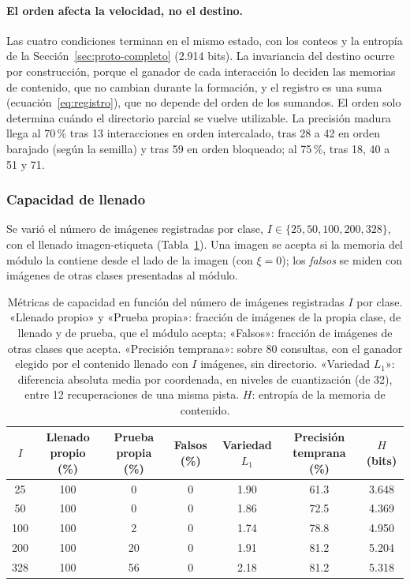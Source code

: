 \paragraph{El orden afecta la velocidad, no el destino.}
Las cuatro condiciones terminan en el mismo estado, con los conteos y la entropía de la
Sección~\ref{sec:proto-completo} (2.914 bits).
La invariancia del destino ocurre por construcción, porque el ganador de cada
interacción lo deciden las memorias de contenido, que no cambian durante la formación, y
el registro es una suma (ecuación~\eqref{eq:registro}), que no depende del orden de los
sumandos.
El orden solo determina cuándo el directorio parcial se vuelve utilizable.
La precisión madura llega al 70\,\% tras 13 interacciones en orden intercalado, tras 28 a
42 en orden barajado (según la semilla) y tras 59 en orden bloqueado; al 75\,\%, tras 18,
40 a 51 y 71.

\subsubsection{Capacidad de llenado}
\label{sec:capacidad}

Se varió el número de imágenes registradas por clase,
$I \in \{25, 50, 100, 200, 328\}$, con el llenado imagen-etiqueta
(Tabla~\ref{tab:capacidad}).
Una imagen se acepta si la memoria del módulo la contiene desde el lado de la imagen
(con $\xi = 0$); los \textit{falsos} se miden con imágenes de otras
clases presentadas al módulo.

\begin{table}[H]
    \centering
    \caption[Métricas de capacidad en función de las imágenes registradas por clase]{Métricas de capacidad en función del número de imágenes registradas $I$
    por clase.
    «Llenado propio» y «Prueba propia»: fracción de imágenes de la propia clase, de
    llenado y de prueba, que el módulo acepta; «Falsos»: fracción de imágenes de otras
    clases que acepta.
    «Precisión temprana»: sobre 80 consultas, con el ganador elegido por el contenido
    llenado con $I$ imágenes, sin directorio. «Variedad $L_1$»: diferencia absoluta media
    por coordenada, en niveles de cuantización (de 32), entre 12 recuperaciones de una
    misma pista. $H$: entropía de la memoria de contenido.}
    \label{tab:capacidad}
    \footnotesize
    \setlength{\tabcolsep}{3pt}
    \begin{tabular}{ccccccc}
        \toprule
        $I$ & Llenado propio (\%) & Prueba propia (\%) & Falsos (\%) & Variedad $L_1$ & Precisión temprana (\%) & $H$ (bits) \\
        \midrule
         25  & 100 &  0 & 0 & 1.90 & 61.3 & 3.648 \\
         50  & 100 &  0 & 0 & 1.86 & 72.5 & 4.369 \\
        100  & 100 &  2 & 0 & 1.74 & 78.8 & 4.950 \\
        200  & 100 & 20 & 0 & 1.91 & 81.2 & 5.204 \\
        328  & 100 & 56 & 0 & 2.18 & 81.2 & 5.318 \\
        \bottomrule
    \end{tabular}
\end{table}

